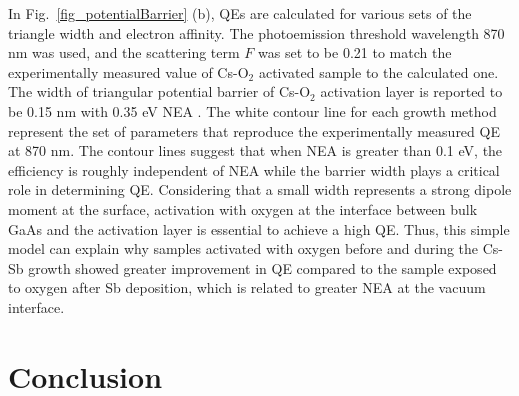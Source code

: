 In Fig.~\ref{fig_potentialBarrier} (b), QEs are calculated for various sets of the triangle width and electron affinity. The photoemission threshold wavelength 870 nm was used, and the scattering term $F$ was set to be 0.21 to match the experimentally measured value of Cs-O$_2$ activated sample to the calculated one. The width of triangular potential barrier of Cs-O$_2$ activation layer is reported to be 0.15 nm \cite{vergara1999} with 0.35 eV NEA \cite{jin2014, bakin2015,uebbing1970}. The white contour line for each growth method represent the set of parameters that reproduce the experimentally measured QE at 870 nm.
The contour lines suggest that when NEA is greater than 0.1 eV, the efficiency is roughly independent of NEA while the barrier width plays a critical role in determining QE. Considering that a small width represents a strong dipole moment at the surface, activation with oxygen at the interface between bulk GaAs and the activation layer is essential to achieve a high QE.
Thus, this simple model can explain why samples activated with oxygen before and during the Cs-Sb growth showed greater improvement in QE compared to the sample exposed to oxygen after Sb deposition, which is related to greater NEA at the vacuum interface.


\section{Conclusion}

